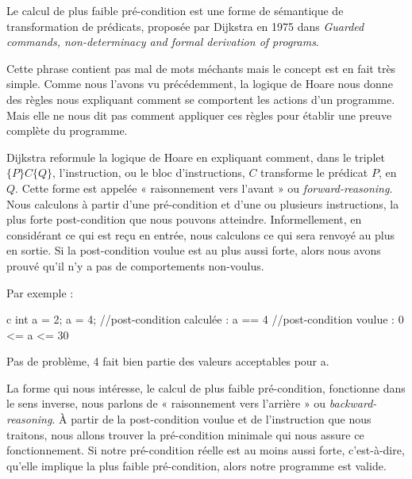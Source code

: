 \documentclass[middle]{zmdocument}
\begin{document}


Le calcul de plus faible pré-condition est une forme de sémantique de 
transformation de prédicats, proposée par Dijkstra en 1975 dans \textit{Guarded 
commands, non-determinacy and formal derivation of programs}.



Cette phrase contient pas mal de mots méchants mais le concept est en fait très
simple. Comme nous l'avons vu précédemment, la logique de Hoare nous donne des
règles nous expliquant comment se comportent les actions d'un programme. Mais 
elle ne nous dit pas comment appliquer ces règles pour établir une preuve 
complète du programme.



Dijkstra reformule la logique de Hoare en expliquant comment, dans le triplet 
$\{P\}C\{Q\}$, l'instruction, ou le bloc d'instructions, $C$ transforme le 
prédicat $P$, en $Q$. Cette forme est appelée « raisonnement vers l'avant » ou 
\textit{forward-reasoning}. Nous calculons à partir d'une pré-condition et d'une ou 
plusieurs instructions, la plus forte post-condition que nous pouvons
atteindre. Informellement, en considérant ce qui est reçu en entrée, nous 
calculons ce qui sera renvoyé au plus en sortie. Si la post-condition voulue
est au plus aussi forte, alors nous avons prouvé qu'il n'y a pas de 
comportements non-voulus.



Par exemple :

\begin{CodeBlock}{c}
int a = 2;
a = 4;
//post-condition calculée : a == 4
//post-condition voulue   : 0 <= a <= 30
\end{CodeBlock}



Pas de problème, 4 fait bien partie des valeurs acceptables pour a.



La forme qui nous intéresse, le calcul de plus faible pré-condition, fonctionne
dans le sens inverse, nous parlons de « raisonnement vers l'arrière » ou 
\textit{backward-reasoning}. À partir de la post-condition voulue et de 
l'instruction que nous traitons, nous allons trouver la pré-condition minimale
qui nous assure ce fonctionnement. Si notre pré-condition réelle est au moins
aussi forte, c'est-à-dire, qu'elle implique la plus faible pré-condition, alors
notre programme est valide.
\end{document}
